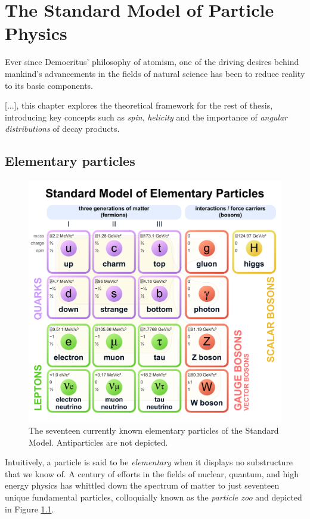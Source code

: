 \chapter{The Standard Model of Particle Physics}

Ever since Democritus' philosophy of atomism, one of the driving desires behind mankind's advancements in the fields of natural science has been to reduce reality to its basic components.

[...], this chapter explores the theoretical framework for the rest of thesis, introducing key concepts such as \textit{spin}, \textit{helicity} and the importance of \textit{angular distributions} of decay products.

\section{Elementary particles}
\begin{figure}[t!]
	\centering
	\includegraphics[scale=0.15]{graphics/01-standard_model/Standard_Model_of_Elementary_Particles.pdf}
	\caption[Currently known Standard Model elementary particles.]{The seventeen currently known elementary particles of the Standard Model. Antiparticles are not depicted.}
	\label{fig:particle_zoo}
\end{figure}

Intuitively, a particle is said to be \textit{elementary} when it displays no substructure that we know of. 
A century of efforts in the fields of nuclear, quantum, and high energy physics has whittled down the spectrum of matter to just seventeen unique fundamental particles, colloquially known as the \textit{particle zoo} and depicted in Figure \ref{fig:particle_zoo}.

